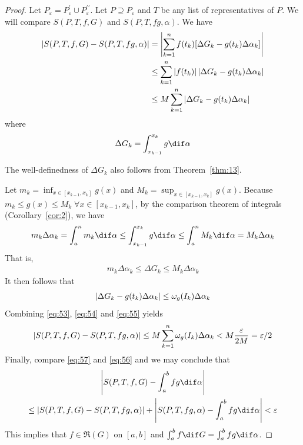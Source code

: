 \documentclass[thmcnt=section, color=blue, 12pt]{my-elegantbook}
\begin{document}
\begin{proof}
	Let $P_\varepsilon = P^\prime_\varepsilon \cup P^{\prime\prime}_\varepsilon$.
	Let $P \supseteq P_\varepsilon$ and $T$ be any list of representatives of $P$.
	We will compare $S(P, T, f, G)$ and $S(P, T, fg, \alpha)$.
	We have
	\begin{align}
		\left\lvert S(P, T, f, G) - S(P, T, fg, \alpha) \right\rvert
		 & = \left\lvert \sum_{k=1}^n f(t_k) [\Delta G_k - g(t_k) \Delta \alpha_k] \right\rvert     \nonumber    \\
		 & \leq \sum_{k=1}^n \left\lvert f(t_k) \right\rvert \left\lvert \Delta G_k - g(t_k) \Delta \alpha_k \right\rvert \nonumber \\
		 & \leq M \sum_{k=1}^n \left\lvert \Delta G_k - g(t_k) \Delta \alpha_k \right\rvert
		\label{eq:53}
	\end{align}
	where
	\begin{align*}
		\Delta G_k = \int_{x_{k-1}}^{x_k} g \dif \alpha
	\end{align*}
	\begin{note}
		The well-definedness of $\Delta G_k$ also follows from Theorem~\ref{thm:13}.
	\end{note}
	Let $m_k = \inf_{x \in [x_{k-1}, x_k]} g(x)$
	and $M_k = \sup_{x \in [x_{k-1}, x_k]} g(x)$.
	Because $m_k \leq g(x) \leq M_k \; \forall x \in [x_{k-1}, x_k]$,
	by the comparison theorem of integrals (Corollary~\ref{cor:2}),
	we have
	\begin{align*}
		m_k \Delta \alpha_k
		= \int_a^n m_k \dif \alpha
		\leq \int_{x_{k-1}}^{x_k} g \dif \alpha
		\leq \int_a^n M_k \dif \alpha
		= M_k \Delta \alpha_k
	\end{align*}
	That is,
	\begin{align*}
		m_k \Delta \alpha_k \leq \Delta G_k \leq M_k \Delta \alpha_k
	\end{align*}
	It then follows that
	\begin{align}
		\left\lvert \Delta G_k - g(t_k) \Delta \alpha_k \right\rvert \leq \omega_g(I_k) \Delta \alpha_k
		\label{eq:54}
	\end{align}
	Combining \eqref{eq:53},  \eqref{eq:54} and \eqref{eq:55} yields
	\begin{align}
		\left\lvert S(P, T, f, G) - S(P, T, fg, \alpha) \right\rvert
		\leq M \sum_{k=1}^n \omega_g(I_k) \Delta \alpha_k
		< M \frac{\varepsilon}{2M}
		=\varepsilon / 2
		\label{eq:57}
	\end{align}
	Finally, compare \eqref{eq:57} and \eqref{eq:56} and we may conclude that
	\begin{multline*}
		\abs{S(P, T, f, G) - \int_a^b f g \dif \alpha} \\
		\leq \abs{S(P, T, f, G) - S(P, T, fg, \alpha)}
		+ \abs{S(P, T, fg, \alpha)-  \int_a^b f g \dif \alpha}
		< \varepsilon
	\end{multline*}
	This implies that $f \in \mathfrak{R}(G)$ on $[a, b]$
	and $\int_a^b f \dif G = \int_a^b f g \dif \alpha$.
\end{proof}


\printbibliography[heading=bibintoc, title=References]


\printindex
\end{document}
